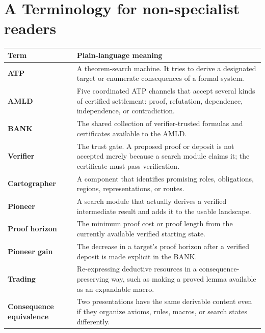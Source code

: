 \documentclass[11pt]{article}
\theoremstyle{remark}
\begin{document}
\section*{A Terminology for non-specialist readers}
\begin{longtable}{>{\bfseries}p{}p{}}
\toprule
Term & Plain-language meaning\\
\midrule
ATP & A theorem-search machine. It tries to derive a designated target or enumerate consequences of a formal system.\\
AMLD & Five coordinated ATP channels that accept several kinds of certified settlement: proof, refutation, dependence, independence, or contradiction.\\
BANK & The shared collection of verifier-trusted formulas and certificates available to the AMLD.\\
Verifier & The trust gate. A proposed proof or deposit is not accepted merely because a search module claims it; the certificate must pass verification.\\
Cartographer & A component that identifies promising roles, obligations, regions, representations, or routes.\\
Pioneer & A search module that actually derives a verified intermediate result and adds it to the usable landscape.\\
Proof horizon & The minimum proof cost or proof length from the currently available verified starting state.\\
Pioneer gain & The decrease in a target's proof horizon after a verified deposit is made explicit in the BANK.\\
Trading & Re-expressing deductive resources in a consequence-preserving way, such as making a proved lemma available as an expandable macro.\\
Consequence equivalence & Two presentations have the same derivable content even if they organize axioms, rules, macros, or search states differently.\\
\bottomrule
\end{longtable}
\end{document}
